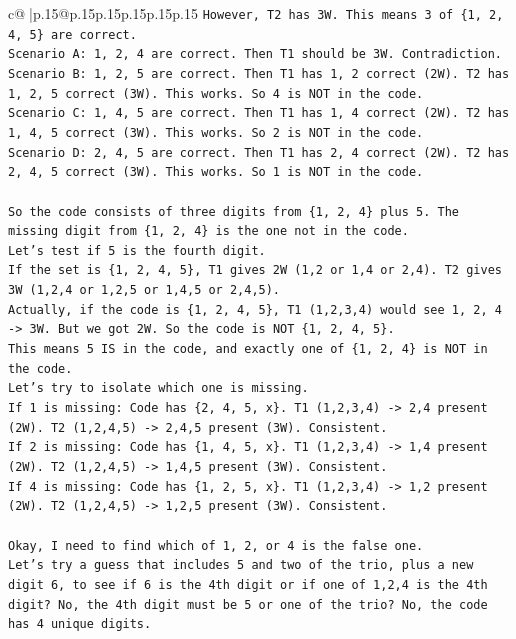 \documentclass{article}
\begin{document}
{\begin{supertabular}{c@{$\;$}|p{.15\linewidth}@{}p{.15\linewidth}p{.15\linewidth}p{.15\linewidth}p{.15\linewidth}p{.15\linewidth}}
{{{\texttt{However, T2 has 3W. This means 3 of \{1, 2, 4, 5\} are correct.} \\
\texttt{Scenario A: 1, 2, 4 are correct. Then T1 should be 3W. Contradiction.} \\
\texttt{Scenario B: 1, 2, 5 are correct. Then T1 has 1, 2 correct (2W). T2 has 1, 2, 5 correct (3W). This works. So 4 is NOT in the code.} \\
\texttt{Scenario C: 1, 4, 5 are correct. Then T1 has 1, 4 correct (2W). T2 has 1, 4, 5 correct (3W). This works. So 2 is NOT in the code.} \\
\texttt{Scenario D: 2, 4, 5 are correct. Then T1 has 2, 4 correct (2W). T2 has 2, 4, 5 correct (3W). This works. So 1 is NOT in the code.} \\
\\ 
\texttt{So the code consists of three digits from \{1, 2, 4\} plus 5. The missing digit from \{1, 2, 4\} is the one not in the code.} \\
\texttt{Let's test if 5 is the fourth digit.} \\
\texttt{If the set is \{1, 2, 4, 5\}, T1 gives 2W (1,2 or 1,4 or 2,4). T2 gives 3W (1,2,4 or 1,2,5 or 1,4,5 or 2,4,5).} \\
\texttt{Actually, if the code is \{1, 2, 4, 5\}, T1 (1,2,3,4) would see 1, 2, 4 {-}> 3W. But we got 2W. So the code is NOT \{1, 2, 4, 5\}.} \\
\texttt{This means 5 IS in the code, and exactly one of \{1, 2, 4\} is NOT in the code.} \\
\texttt{Let's try to isolate which one is missing.} \\
\texttt{If 1 is missing: Code has \{2, 4, 5, x\}. T1 (1,2,3,4) {-}> 2,4 present (2W). T2 (1,2,4,5) {-}> 2,4,5 present (3W). Consistent.} \\
\texttt{If 2 is missing: Code has \{1, 4, 5, x\}. T1 (1,2,3,4) {-}> 1,4 present (2W). T2 (1,2,4,5) {-}> 1,4,5 present (3W). Consistent.} \\
\texttt{If 4 is missing: Code has \{1, 2, 5, x\}. T1 (1,2,3,4) {-}> 1,2 present (2W). T2 (1,2,4,5) {-}> 1,2,5 present (3W). Consistent.} \\
\\ 
\texttt{Okay, I need to find which of 1, 2, or 4 is the false one.} \\
\texttt{Let's try a guess that includes 5 and two of the trio, plus a new digit 6, to see if 6 is the 4th digit or if one of 1,2,4 is the 4th digit? No, the 4th digit must be 5 or one of the trio? No, the code has 4 unique digits.} \\
}}}
\end{supertabular}}
\end{document}
